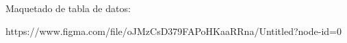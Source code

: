 
Maquetado de tabla de datos:

https://www.figma.com/file/oJMzCsD379FAPoHKaaRRna/Untitled?node-id=0%